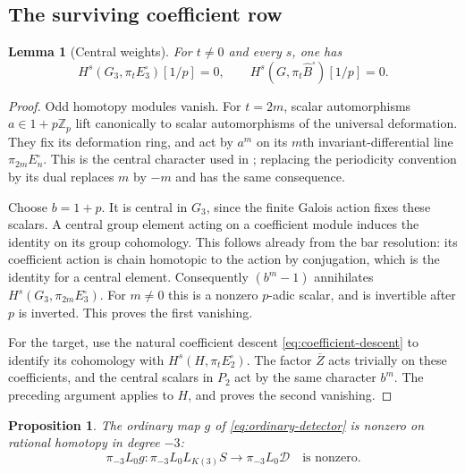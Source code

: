 \documentclass[11pt]{article}
\numberwithin{equation}{section}
\newtheorem{proposition}[theorem]{Proposition}
\newtheorem{lemma}[theorem]{Lemma}
\theoremstyle{definition}
\theoremstyle{remark}
\begin{document}
\subsection{The surviving coefficient row}

\begin{lemma}[Central weights]\label{lem:central-weights}
For $t\ne0$ and every $s$, one has
\[
 H^s(G_3,\pi_tE_3^{\square})[1/p]=0,
 \qquad
 H^s(G,\pi_t\widehat B^{\square})[1/p]=0.
\]
\end{lemma}

\begin{proof}
Odd homotopy modules vanish.  For $t=2m$, scalar automorphisms
$a\in1+p\mathbb Z_p$ lift canonically to scalar automorphisms of the universal
deformation.  They fix its deformation ring, and act by $a^m$ on its
$m$th invariant-differential line $\pi_{2m}E_n^{\square}$.
This is the central character used in
\cite[Lemma~2.6.1]{BSSW2025}; replacing the periodicity convention by its
dual replaces $m$ by $-m$ and has the same consequence.

Choose $b=1+p$.  It is central in $G_3$, since the finite Galois action
fixes these scalars.  A central group element acting on a coefficient
module induces the identity on its group cohomology.  This follows
already from the bar resolution: its coefficient action is chain
homotopic to the action by conjugation, which is the identity for a
central element.  Consequently $(b^m-1)$ annihilates
$H^s(G_3,\pi_{2m}E_3^{\square})$.  For $m\ne0$ this is a nonzero
$p$-adic scalar, and is invertible after $p$ is inverted.  This proves
the first vanishing.

For the target, use the natural coefficient descent
\eqref{eq:coefficient-descent} to identify its cohomology with
$H^s(H,\pi_tE_2^{\square})$.  The factor $\overline Z$ acts trivially
on these coefficients, and the central scalars in $P_2$ act by the same
character $b^m$.  The preceding argument applies to $H$, and proves
the second vanishing.
\end{proof}

\begin{proposition}\label{prop:nonzero-detector}
The ordinary map $g$ of \eqref{eq:ordinary-detector} is nonzero on
rational homotopy in degree $-3$:
\[
 \pi_{-3}L_0g:\pi_{-3}L_0L_{K(3)}S
                    \longrightarrow\pi_{-3}L_0\mathcal D
 \quad\text{is nonzero}.
\]
\end{proposition}
\end{document}
